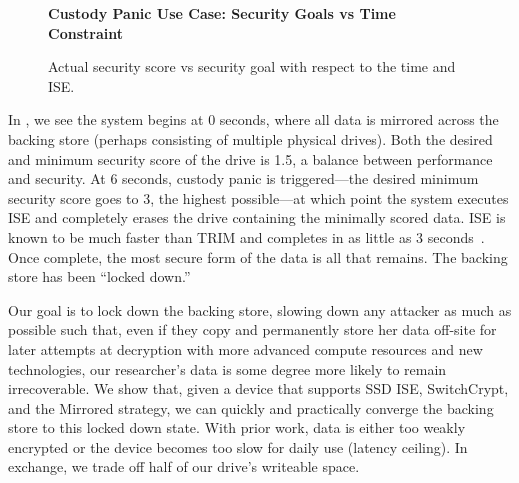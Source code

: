 \begin{figure}[ht] \textbf{Custody Panic Use Case: Security Goals vs Time
Constraint}\par\medskip
   \centering
   {} \caption{Actual security score vs
   security goal with respect to the time and ISE.}
  \label{fig:usecase-custody}
\end{figure}

In , we see the system begins at 0 seconds, where
all data is mirrored across the backing store (perhaps consisting of multiple
physical drives). Both the desired and minimum security score of the drive is
1.5, a balance between performance and security. At 6 seconds, custody panic is
triggered---the desired minimum security score goes to 3, the highest possible---at which point the
system executes ISE and completely erases the drive containing the minimally
scored data. ISE is known to be much faster than TRIM and completes in as little
as 3 seconds~\cite{SeaGate,Samsung,ThatOtherOEM}. Once complete, the most secure
form of the data is all that remains. The backing store has been ``locked
down.''

Our goal is to lock down the backing store, slowing down any attacker as
much as possible such that, even if they copy and permanently store her data
off-site for later attempts at decryption with more advanced compute resources
and new technologies, our researcher's data is some degree more likely to remain
irrecoverable. We show that, given a device that supports SSD ISE, SwitchCrypt,
and the Mirrored strategy, we can quickly and practically converge the backing
store to this locked down state. With prior work, data is either too weakly
encrypted or the device becomes too slow for daily use (latency ceiling). In
exchange, we trade off half of our drive's writeable space.

